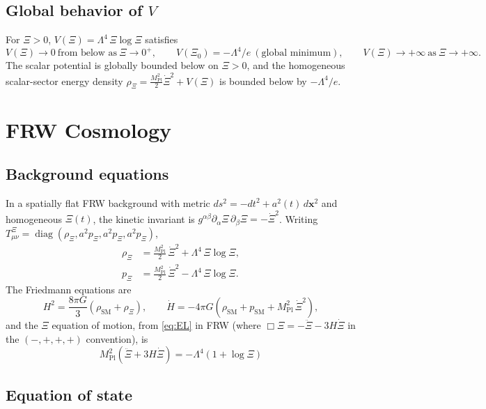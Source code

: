 \documentclass[11pt,reqno]{amsart}
\theoremstyle{plain}
\theoremstyle{definition}
\theoremstyle{remark}
\newcommand{\Pl}{\mathrm{Pl}}
\newcommand{\SM}{\mathrm{SM}}
\DeclareMathOperator{\diag}{diag}
\begin{document}
\subsection{Global behavior of $V$}

For $\Xi > 0$, $V(\Xi) = \Lambda^{4}\,\Xi\log\Xi$ satisfies
\[
  V(\Xi) \to 0\ \text{from below as}\ \Xi \to 0^{+},\qquad
  V(\Xi_0) = -\Lambda^{4}/e\ (\text{global minimum}),\qquad
  V(\Xi) \to +\infty\ \text{as}\ \Xi \to +\infty.
\]
The scalar potential is globally bounded below on $\Xi > 0$, and the
homogeneous scalar-sector energy density
$\rho_\Xi = \tfrac{M_\Pl^{2}}{2}\dot\Xi^{2} + V(\Xi)$ is bounded below
by $-\Lambda^{4}/e$.

\section{FRW Cosmology}\label{sec:frw}

\subsection{Background equations}

In a spatially flat FRW background with metric
$ds^{2} = -dt^{2} + a^{2}(t)\, d\mathbf{x}^{2}$ and homogeneous $\Xi(t)$,
the kinetic invariant is
$g^{\alpha\beta}\partial_\alpha \Xi\, \partial_\beta \Xi = -\dot\Xi^{2}$.
Writing $T^{\Xi}_{\mu\nu} = \diag(\rho_\Xi, a^{2} p_\Xi, a^{2} p_\Xi, a^{2} p_\Xi)$,
\begin{align}
  \rho_\Xi &= \frac{M_\Pl^{2}}{2}\,\dot\Xi^{2} + \Lambda^{4}\,\Xi\log\Xi,\label{eq:rho}\\
  p_\Xi &= \frac{M_\Pl^{2}}{2}\,\dot\Xi^{2} - \Lambda^{4}\,\Xi\log\Xi.\label{eq:p}
\end{align}
The Friedmann equations are
\begin{equation}\label{eq:friedmann}
  H^{2} = \frac{8\pi G}{3}\!\left(\rho_{\SM} + \rho_\Xi\right),\qquad
  \dot H = -4\pi G\!\left(\rho_{\SM} + p_{\SM} + M_\Pl^{2}\,\dot\Xi^{2}\right),
\end{equation}
and the $\Xi$ equation of motion, from \eqref{eq:EL} in FRW (where
$\Box\Xi = -\ddot\Xi - 3H\dot\Xi$ in the $(-,+,+,+)$ convention), is
\begin{equation}\label{eq:xieom}
  \boxed{\;M_\Pl^{2}(\ddot\Xi + 3H\dot\Xi) = -\Lambda^{4}(1 + \log\Xi)\;}
\end{equation}

\subsection{Equation of state}
\end{document}
